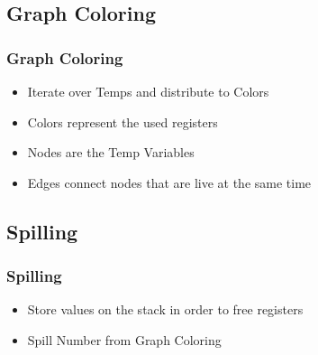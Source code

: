 \begin{frame}
    \section*{Graph Coloring}
    \frametitle{Graph Coloring}
    \begin{itemize}
        \item Iterate over Temps and distribute to Colors
        \item Colors represent the used registers
        \item Nodes are the Temp Variables
        \item Edges connect nodes that are live at the same time
    \end{itemize}
\end{frame}

\begin{frame}
    \section*{Spilling}
    \frametitle{Spilling}
    \begin{itemize}
        \item Store values on the stack in order to free registers
        \item Spill Number from Graph Coloring
    \end{itemize}
\end{frame}
